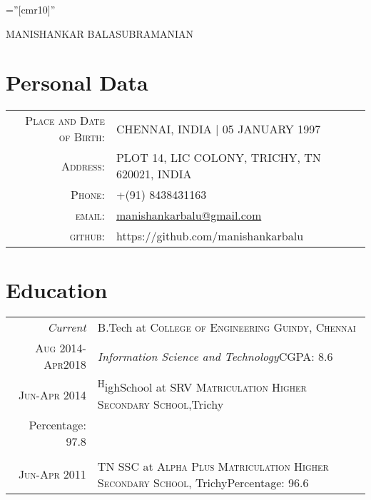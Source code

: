 \documentclass[a4paper,10pt]{article}
\begin{document}

\pagestyle{empty} %

\font\fb=''[cmr10]'' %

\par{\centering
		{\Huge MANISHANKAR \textsc{BALASUBRAMANIAN}
	}\bigskip\par}

\section{Personal Data}

\begin{tabular}{rl}
    \textsc{Place and Date of Birth:} & CHENNAI, INDIA  | 05 JANUARY 1997 \\
    \textsc{Address:}   & PLOT 14, LIC COLONY, TRICHY, TN 620021, INDIA \\
    \textsc{Phone:}     & +(91) 8438431163\\
    \textsc{email:}     &  \href{mailto:manishankarbalu@gmail.com}{manishankarbalu@gmail.com}\\
    \textsc{github:}    & https://github.com/manishankarbalu 
\end{tabular}

\section{Education}
\begin{tabular}{r|p{11cm}}
 \emph{Current} & B.Tech at \textsc{College of Engineering Guindy, Chennai}\\\textsc{Aug 2014-Apr2018}&\emph{Information Science and Technology}\hfill CGPA: 8.6\multicolumn{2}{c}{} \\
 \textsc{Jun-Apr 2014} & \textsuperscript HighSchool at \textsc{SRV Matriculation Higher Secondary School},Trichy\\    \hfill Percentage: 97.8\multicolumn{2}{c}{} \\\\
\textsc{Jun-Apr 2011} & TN SSC at \textsc{ Alpha Plus Matriculation Higher Secondary School}, Trichy\hfill Percentage: 96.6
\end{tabular}
\end{document}
